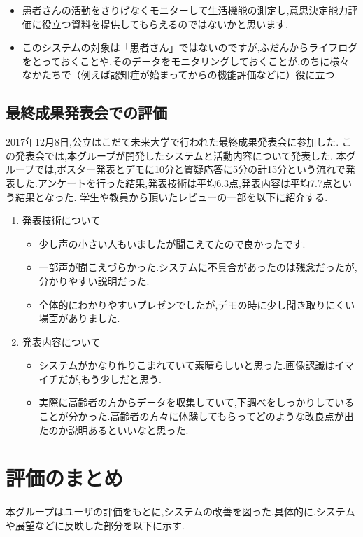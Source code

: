 \documentclass[../report]{subfiles}
\begin{document}
\begin{itemize}
    \item 患者さんの活動をさりげなくモニターして生活機能の測定し,意思決定能力評価に役立つ資料を提供してもらえるのではないかと思います.
    \item このシステムの対象は「患者さん」ではないのですが,ふだんからライフログをとっておくことや,そのデータをモニタリングしておくことが,のちに様々なかたちで（例えば認知症が始まってからの機能評価などに）役に立つ.
\end{itemize}

\subsection{最終成果発表会での評価}
2017年12月8日,公立はこだて未来大学で行われた最終成果発表会に参加した.
この発表会では,本グループが開発したシステムと活動内容について発表した.
本グループでは,ポスター発表とデモに10分と質疑応答に5分の計15分という流れで発表した.アンケートを行った結果,発表技術は平均6.3点,発表内容は平均7.7点という結果となった.
学生や教員から頂いたレビューの一部を以下に紹介する.

\begin{enumerate}
    \item[] 発表技術について
\begin{itemize}
    \item 少し声の小さい人もいましたが聞こえてたので良かったです.
    \item 一部声が聞こえづらかった.システムに不具合があったのは残念だったが,分かりやすい説明だった.
    \item 全体的にわかりやすいプレゼンでしたが,デモの時に少し聞き取りにくい場面がありました.
\end{itemize}

    \item[] 発表内容について
\begin{itemize}
    \item システムがかなり作りこまれていて素晴らしいと思った.画像認識はイマイチだが,もう少しだと思う.
    \item 実際に高齢者の方からデータを収集していて,下調べをしっかりしていることが分かった.高齢者の方々に体験してもらってどのような改良点が出たのか説明あるといいなと思った.
\end{itemize}
\end{enumerate}

\section{評価のまとめ}
本グループはユーザの評価をもとに,システムの改善を図った.具体的に,システムや展望などに反映した部分を以下に示す.
\end{document}
